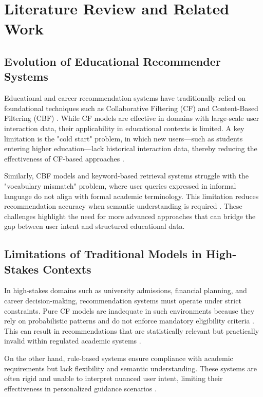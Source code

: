 \documentclass[conference]{IEEEtran}
\begin{document}
\section{Literature Review and Related Work}

\subsection{Evolution of Educational Recommender Systems}
Educational and career recommendation systems have traditionally relied on foundational techniques such as Collaborative Filtering (CF) and Content-Based Filtering (CBF) \cite{elhalees2021towards, sani2021recommender}. While CF models are effective in domains with large-scale user interaction data, their applicability in educational contexts is limited. A key limitation is the "cold start" problem, in which new users—such as students entering higher education—lack historical interaction data, thereby reducing the effectiveness of CF-based approaches \cite{bakhshinategh2023course, alghamdi2021collaborative, tarus2018matrix}.

Similarly, CBF models and keyword-based retrieval systems struggle with the "vocabulary mismatch" problem, where user queries expressed in informal language do not align with formal academic terminology. This limitation reduces recommendation accuracy when semantic understanding is required \cite{silva2026systematic, almadani2023recommender}. These challenges highlight the need for more advanced approaches that can bridge the gap between user intent and structured educational data.

\subsection{Limitations of Traditional Models in High-Stakes Contexts}
In high-stakes domains such as university admissions, financial planning, and career decision-making, recommendation systems must operate under strict constraints. Pure CF models are inadequate in such environments because they rely on probabilistic patterns and do not enforce mandatory eligibility criteria \cite{seu2024stream}. This can result in recommendations that are statistically relevant but practically invalid within regulated academic systems \cite{island2025admission}.

On the other hand, rule-based systems ensure compliance with academic requirements but lack flexibility and semantic understanding. These systems are often rigid and unable to interpret nuanced user intent, limiting their effectiveness in personalized guidance scenarios \cite{zhang2022state, wang2018research}.
\end{document}
